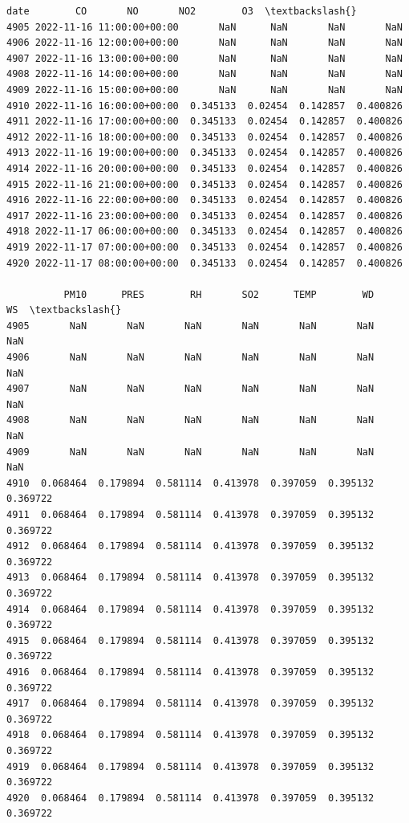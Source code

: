 \documentclass[11pt]{article}
\makeatletter
\newcommand{\boxspacing}{\kern\kvtcb@left@rule\kern\kvtcb@boxsep}
\newcommand{\prompt}[4]{
        {\ttfamily\llap{{\color{#2}[#3]:\hspace{3pt}#4}}\vspace{-\baselineskip}}
    }
\makeatother
\begin{document}
            \begin{tcolorbox}[breakable, size=fbox, boxrule=.5pt, pad at break*=1mm, opacityfill=0]
\prompt{Out}{outcolor}{47}{\boxspacing}
\begin{Verbatim}[commandchars=\\\{\}]
                          date        CO       NO       NO2        O3  \textbackslash{}
4905 2022-11-16 11:00:00+00:00       NaN      NaN       NaN       NaN
4906 2022-11-16 12:00:00+00:00       NaN      NaN       NaN       NaN
4907 2022-11-16 13:00:00+00:00       NaN      NaN       NaN       NaN
4908 2022-11-16 14:00:00+00:00       NaN      NaN       NaN       NaN
4909 2022-11-16 15:00:00+00:00       NaN      NaN       NaN       NaN
4910 2022-11-16 16:00:00+00:00  0.345133  0.02454  0.142857  0.400826
4911 2022-11-16 17:00:00+00:00  0.345133  0.02454  0.142857  0.400826
4912 2022-11-16 18:00:00+00:00  0.345133  0.02454  0.142857  0.400826
4913 2022-11-16 19:00:00+00:00  0.345133  0.02454  0.142857  0.400826
4914 2022-11-16 20:00:00+00:00  0.345133  0.02454  0.142857  0.400826
4915 2022-11-16 21:00:00+00:00  0.345133  0.02454  0.142857  0.400826
4916 2022-11-16 22:00:00+00:00  0.345133  0.02454  0.142857  0.400826
4917 2022-11-16 23:00:00+00:00  0.345133  0.02454  0.142857  0.400826
4918 2022-11-17 06:00:00+00:00  0.345133  0.02454  0.142857  0.400826
4919 2022-11-17 07:00:00+00:00  0.345133  0.02454  0.142857  0.400826
4920 2022-11-17 08:00:00+00:00  0.345133  0.02454  0.142857  0.400826

          PM10      PRES        RH       SO2      TEMP        WD        WS  \textbackslash{}
4905       NaN       NaN       NaN       NaN       NaN       NaN       NaN
4906       NaN       NaN       NaN       NaN       NaN       NaN       NaN
4907       NaN       NaN       NaN       NaN       NaN       NaN       NaN
4908       NaN       NaN       NaN       NaN       NaN       NaN       NaN
4909       NaN       NaN       NaN       NaN       NaN       NaN       NaN
4910  0.068464  0.179894  0.581114  0.413978  0.397059  0.395132  0.369722
4911  0.068464  0.179894  0.581114  0.413978  0.397059  0.395132  0.369722
4912  0.068464  0.179894  0.581114  0.413978  0.397059  0.395132  0.369722
4913  0.068464  0.179894  0.581114  0.413978  0.397059  0.395132  0.369722
4914  0.068464  0.179894  0.581114  0.413978  0.397059  0.395132  0.369722
4915  0.068464  0.179894  0.581114  0.413978  0.397059  0.395132  0.369722
4916  0.068464  0.179894  0.581114  0.413978  0.397059  0.395132  0.369722
4917  0.068464  0.179894  0.581114  0.413978  0.397059  0.395132  0.369722
4918  0.068464  0.179894  0.581114  0.413978  0.397059  0.395132  0.369722
4919  0.068464  0.179894  0.581114  0.413978  0.397059  0.395132  0.369722
4920  0.068464  0.179894  0.581114  0.413978  0.397059  0.395132  0.369722


\end{Verbatim}
\end{tcolorbox}
\end{document}

